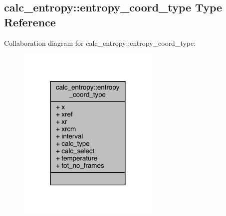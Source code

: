 \hypertarget{structcalc__entropy_1_1entropy__coord__type}{\subsection{calc\-\_\-entropy\-:\-:entropy\-\_\-coord\-\_\-type Type Reference}
\label{structcalc__entropy_1_1entropy__coord__type}
}


Collaboration diagram for calc\-\_\-entropy\-:\-:entropy\-\_\-coord\-\_\-type\-:
\nopagebreak
\begin{figure}[H]
\begin{center}
\leavevmode
\includegraphics[width=192pt]{structcalc__entropy_1_1entropy__coord__type__coll__graph}
\end{center}
\end{figure}
